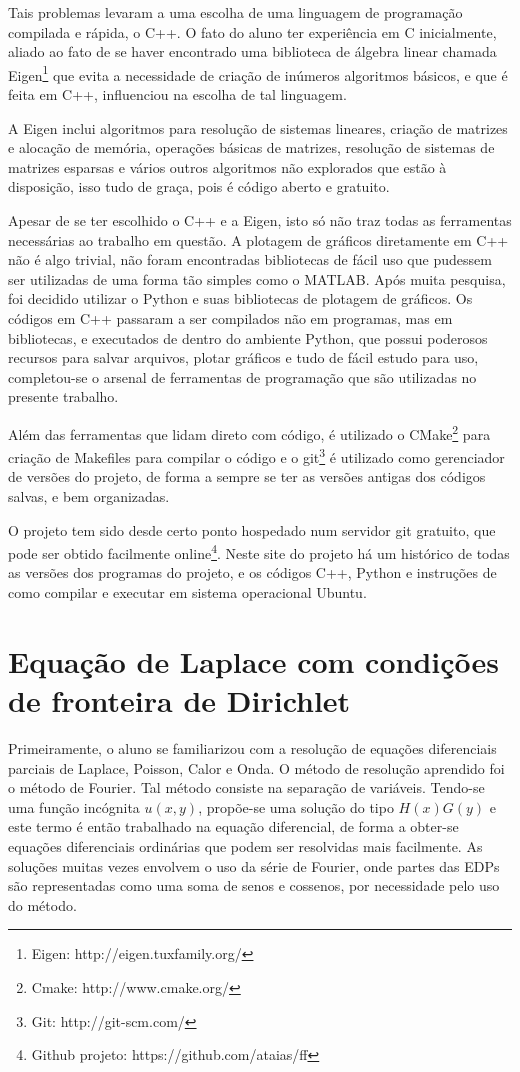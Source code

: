 \documentclass[journal]{IEEEtran}
\begin{document}
Tais problemas levaram a uma escolha de uma linguagem de programação compilada e rápida, o C++. O fato do aluno ter experiência em C inicialmente, aliado ao fato de se haver encontrado uma biblioteca de álgebra linear chamada Eigen\footnote{Eigen: http://eigen.tuxfamily.org/} que evita a necessidade de criação de inúmeros algoritmos básicos, e que é feita em C++, influenciou na escolha de tal linguagem.

A Eigen inclui algoritmos para resolução de sistemas lineares, criação de matrizes e alocação de memória, operações básicas de matrizes, resolução de sistemas de matrizes esparsas e vários outros algoritmos não explorados que estão à disposição, isso tudo de graça, pois é código aberto e gratuito. 

Apesar de se ter escolhido o C++ e a Eigen, isto só não traz todas as ferramentas necessárias ao trabalho em questão. A plotagem de gráficos diretamente em C++ não é algo trivial, não foram encontradas bibliotecas de fácil uso que pudessem ser utilizadas de uma forma tão simples como o MATLAB. Após muita pesquisa, foi decidido utilizar o Python e suas bibliotecas de plotagem de gráficos. Os códigos em C++ passaram a ser compilados não em programas, mas em bibliotecas, e executados de dentro do ambiente Python, que possui poderosos recursos para salvar arquivos, plotar gráficos e tudo de fácil estudo para uso, completou-se o arsenal de ferramentas de programação que são utilizadas no presente trabalho.

Além das ferramentas que lidam direto com código, é utilizado o CMake\footnote{Cmake: http://www.cmake.org/} para criação de Makefiles para compilar o código e o git\footnote{Git: http://git-scm.com/} é utilizado como gerenciador de versões do projeto, de forma a sempre se ter as versões antigas dos códigos salvas, e bem organizadas.

O projeto tem sido desde certo ponto hospedado num servidor git gratuito, que pode ser obtido facilmente online\footnote{Github projeto: https://github.com/ataias/ff}. Neste site do projeto há um histórico de todas as versões dos programas do projeto, e os códigos C++, Python e instruções de como compilar e executar em sistema operacional Ubuntu.
\section{Equação de Laplace com condições de fronteira de Dirichlet}
Primeiramente, o aluno se familiarizou com a resolução de equações diferenciais parciais de Laplace, Poisson, Calor e Onda. O método de resolução aprendido foi o método de Fourier. Tal método consiste na separação de variáveis. Tendo-se uma função incógnita $u(x,y)$, propõe-se uma solução do tipo $H(x)G(y)$ e este termo é então trabalhado na equação diferencial, de forma a obter-se equações diferenciais ordinárias que podem ser resolvidas mais facilmente. As soluções muitas vezes envolvem o uso da série de Fourier, onde partes das EDPs são representadas como uma soma de senos e cossenos, por necessidade pelo uso do método.
\end{document}
